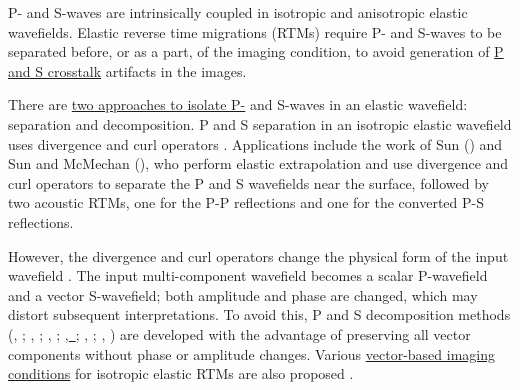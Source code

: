 \documentclass[manuscript,ulem,graphix,revised]{geophysics}
\begin{document}
\indent\indent
P- and S-waves are intrinsically coupled in isotropic and anisotropic elastic wavefields. Elastic reverse time migrations (RTMs) require P- and S-waves to be separated before, or as a part, of the imaging condition, to avoid generation of \marginnote{[34]}\uline{P and S crosstalk} artifacts in the images.

There are \marginnote{[8]}\uline{two approaches to isolate P-} and S-waves in an elastic wavefield: separation and decomposition. P and S separation in an isotropic elastic wavefield uses divergence and curl operators \citep{morse53,clayton81,mora87}. Applications include the work of Sun (\citeyear{sun99}) and Sun and McMechan (\citeyear{sun01}), who perform elastic extrapolation and use divergence and curl operators to separate the P and S wavefields near the surface, followed by two acoustic RTMs, one for the P-P reflections and one for the converted P-S reflections. 

However, the divergence and curl operators change the physical form of the input wavefield \citep{wenlong_ps15}. The input multi-component wavefield becomes a scalar P-wavefield and a vector S-wavefield; both amplitude and phase are changed, which may distort subsequent interpretations. To avoid this, P and S decomposition methods 
(\citeauthor{ma03}, \citeyear{ma03}; \citeauthor{zhang07}, \citeyear{zhang07}; \citeauthor{xiao10}, \citeyear{xiao10}; \mbox{\uline{\citeauthor{zhang10}, \citeyear{zhang10}}}; \marginnote{[35]} \citeauthor{wenlong_ps15}, \citeyear{wenlong_ps15}; \citeauthor{wenlong_vsc15}, \citeyear{wenlong_vsc15})
are developed with the advantage of preserving all vector components without phase or amplitude changes. Various \marginnote{[9]}\uline{vector-based imaging conditions} for isotropic elastic RTMs are also proposed \citep{wenlong_vct15,wenlong_vct16,wang16}.

\end{document}
